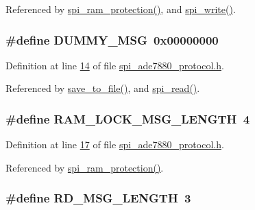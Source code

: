 Referenced by \hyperlink{a00040_source_l00343}{spi\-\_\-ram\-\_\-protection()}, and \hyperlink{a00040_source_l00221}{spi\-\_\-write()}.

\hypertarget{a00041_af87bc226c5bc1e648d8ceac69ccf2bcb}{
\subsubsection[{D\-U\-M\-M\-Y\-\_\-\-M\-S\-G}]{\setlength{\rightskip}{0pt plus 5cm}\#define D\-U\-M\-M\-Y\-\_\-\-M\-S\-G~0x00000000}}\label{dd/d32/a00041_af87bc226c5bc1e648d8ceac69ccf2bcb}


Definition at line \hyperlink{a00041_source_l00014}{14} of file \hyperlink{a00041_source}{spi\-\_\-ade7880\-\_\-protocol.\-h}.



Referenced by \hyperlink{a00035_source_l00421}{save\-\_\-to\-\_\-file()}, and \hyperlink{a00040_source_l00147}{spi\-\_\-read()}.

\hypertarget{a00041_ab38a2f23d72262bab020eb973958f37b}{
\subsubsection[{R\-A\-M\-\_\-\-L\-O\-C\-K\-\_\-\-M\-S\-G\-\_\-\-L\-E\-N\-G\-T\-H}]{\setlength{\rightskip}{0pt plus 5cm}\#define R\-A\-M\-\_\-\-L\-O\-C\-K\-\_\-\-M\-S\-G\-\_\-\-L\-E\-N\-G\-T\-H~4}}\label{dd/d32/a00041_ab38a2f23d72262bab020eb973958f37b}


Definition at line \hyperlink{a00041_source_l00017}{17} of file \hyperlink{a00041_source}{spi\-\_\-ade7880\-\_\-protocol.\-h}.



Referenced by \hyperlink{a00040_source_l00343}{spi\-\_\-ram\-\_\-protection()}.

\hypertarget{a00041_a0f0795755fb9e8e47c78c1289e091282}{
\subsubsection[{R\-D\-\_\-\-M\-S\-G\-\_\-\-L\-E\-N\-G\-T\-H}]{\setlength{\rightskip}{0pt plus 5cm}\#define R\-D\-\_\-\-M\-S\-G\-\_\-\-L\-E\-N\-G\-T\-H~3}}\label{dd/d32/a00041_a0f0795755fb9e8e47c78c1289e091282}


